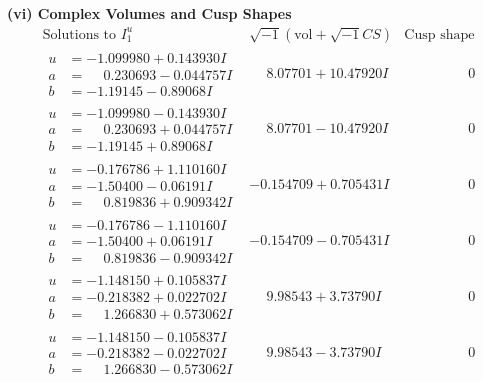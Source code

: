 \documentclass[1p]{elsarticle_modified}
\theoremstyle{definition}
\newcommand{\I}{\sqrt{-1}}
\begin{document}
\newpage\flushleft \textbf{(vi) Complex Volumes and Cusp Shapes}
$$\begin{array}{c|c|c}  
\text{Solutions to }I^u_{1}& \I (\text{vol} + \sqrt{-1}CS) & \text{Cusp shape}\\
 \hline 
\begin{aligned}
u &= -1.099980 + 0.143930 I \\
a &= \phantom{-}0.230693 - 0.044757 I \\
b &= -1.19145 - 0.89068 I\end{aligned}
 & \phantom{-}8.07701 + 10.47920 I & \phantom{-0.000000 } 0 \\ \hline\begin{aligned}
u &= -1.099980 - 0.143930 I \\
a &= \phantom{-}0.230693 + 0.044757 I \\
b &= -1.19145 + 0.89068 I\end{aligned}
 & \phantom{-}8.07701 - 10.47920 I & \phantom{-0.000000 } 0 \\ \hline\begin{aligned}
u &= -0.176786 + 1.110160 I \\
a &= -1.50400 - 0.06191 I \\
b &= \phantom{-}0.819836 + 0.909342 I\end{aligned}
 & -0.154709 + 0.705431 I & \phantom{-0.000000 } 0 \\ \hline\begin{aligned}
u &= -0.176786 - 1.110160 I \\
a &= -1.50400 + 0.06191 I \\
b &= \phantom{-}0.819836 - 0.909342 I\end{aligned}
 & -0.154709 - 0.705431 I & \phantom{-0.000000 } 0 \\ \hline\begin{aligned}
u &= -1.148150 + 0.105837 I \\
a &= -0.218382 + 0.022702 I \\
b &= \phantom{-}1.266830 + 0.573062 I\end{aligned}
 & \phantom{-}9.98543 + 3.73790 I & \phantom{-0.000000 } 0 \\ \hline\begin{aligned}
u &= -1.148150 - 0.105837 I \\
a &= -0.218382 - 0.022702 I \\
b &= \phantom{-}1.266830 - 0.573062 I\end{aligned}
 & \phantom{-}9.98543 - 3.73790 I & \phantom{-0.000000 } 0 \\ \hline\begin{aligned}

\end{aligned}
\end{array}$$
\end{document}
